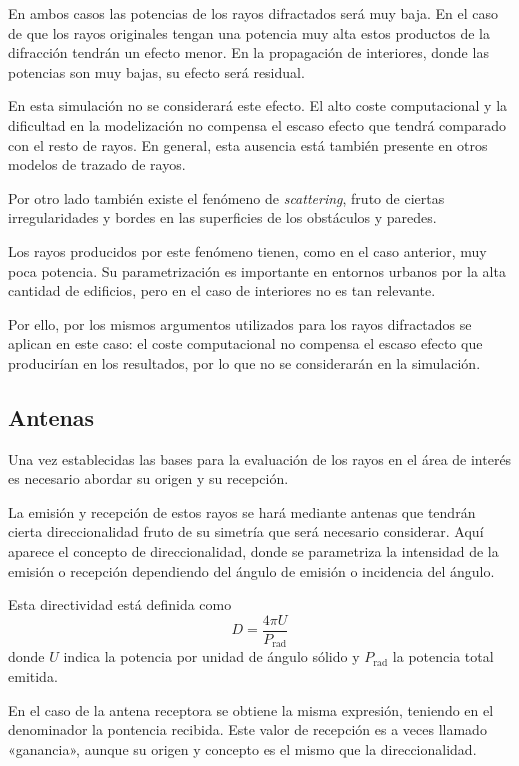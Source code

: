 En ambos casos las potencias de los rayos difractados será muy baja.
En el caso de que los rayos originales tengan una potencia muy alta estos productos de la difracción tendrán un efecto menor.
En la propagación de interiores, donde las potencias son muy bajas, su efecto será residual.\cite{5G_Simulation}

En esta simulación no se considerará este efecto.
El alto coste computacional y la dificultad en la modelización no compensa el escaso efecto que tendrá comparado con el resto de rayos.
En general, esta ausencia está también presente en otros modelos de trazado de rayos.

Por otro lado también existe el fenómeno de \textit{scattering}, fruto de ciertas irregularidades y bordes en las superficies de los obstáculos y paredes.\cite{Compilation}

Los rayos producidos por este fenómeno tienen, como en el caso anterior, muy poca potencia.
Su parametrización es importante en entornos urbanos por la alta cantidad de edificios, pero en el caso de interiores no es tan relevante.

Por ello, por los mismos argumentos utilizados para los rayos difractados se aplican en este caso: el coste computacional no compensa el escaso efecto que producirían en los resultados, por lo que no se considerarán en la simulación.

\subsection{Antenas}

Una vez establecidas las bases para la evaluación de los rayos en el área de interés es necesario abordar su origen y su recepción.

La emisión y recepción de estos rayos se hará mediante antenas que tendrán cierta direccionalidad fruto de su simetría que será necesario considerar.
Aquí aparece el concepto de direccionalidad, donde se parametriza la intensidad de la emisión o recepción dependiendo del ángulo de emisión o incidencia del ángulo.\cite{Antennas}

Esta directividad está definida como
\begin{equation}
    D = \frac{4\pi U}{P_\text{rad}}
\end{equation}
donde $U$ indica la potencia por unidad de ángulo sólido y $P_\text{rad}$ la potencia total emitida.

En el caso de la antena receptora se obtiene la misma expresión, teniendo en el denominador la pontencia recibida.
Este valor de recepción es a veces llamado «ganancia», aunque su origen y concepto es el mismo que la direccionalidad.

